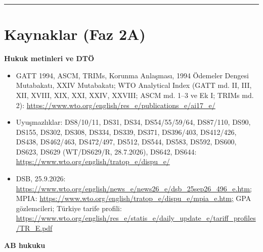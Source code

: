 \endgroup

\begin{center}\rule{0.5\linewidth}{0.5pt}\end{center}

\hypertarget{02a_politika_uzayi-kaynaklar-faz-2a}{%
\section{Kaynaklar (Faz 2A)}\label{02a_politika_uzayi-kaynaklar-faz-2a}}

\textbf{Hukuk metinleri ve DTÖ}

\begin{itemize}
\tightlist
\item
  GATT 1994, ASCM, TRIMs, Korunma Anlaşması, 1994 Ödemeler Dengesi Mutabakatı, XXIV Mutabakatı; WTO Analytical Index (GATT md. II, III, XII, XVIII, XIX, XXI, XXIV, XXVIII; ASCM md. 1--3 ve Ek I; TRIMs md. 2): \url{https://www.wto.org/english/res_e/publications_e/ai17_e/}
\item
  Uyuşmazlıklar: DS8/10/11, DS31, DS34, DS54/55/59/64, DS87/110, DS90, DS155, DS302, DS308, DS334, DS339, DS371, DS396/403, DS412/426, DS438, DS462/463, DS472/497, DS512, DS544, DS583, DS592, DS600, DS623, DS629 (WT/DS629/R, 28.7.2026), DS642, DS644: \url{https://www.wto.org/english/tratop_e/dispu_e/}
\item
  DSB, 25.9.2026: \url{https://www.wto.org/english/news_e/news26_e/dsb_25sep26_496_e.htm;} MPIA: \url{https://www.wto.org/english/tratop_e/dispu_e/mpia_e.htm;} GPA gözlemcileri; Türkiye tarife profili: \url{https://www.wto.org/english/res_e/statis_e/daily_update_e/tariff_profiles/TR_E.pdf}
\end{itemize}

\textbf{AB hukuku}

